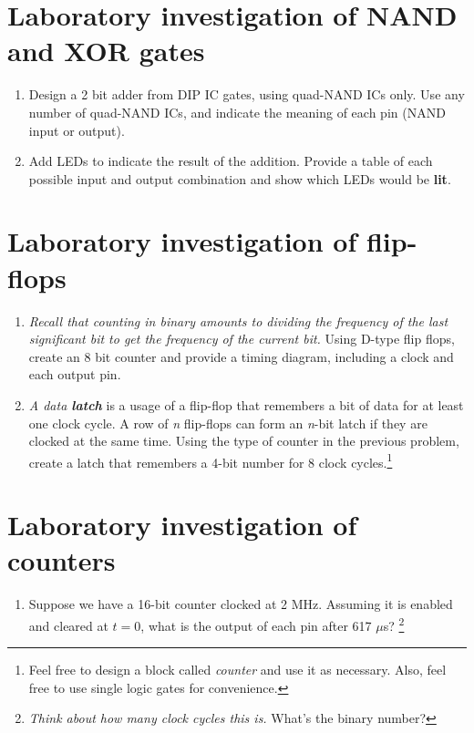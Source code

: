 \documentclass[10pt]{article}
\begin{document}
\section{Laboratory investigation of NAND and XOR gates}
\begin{enumerate}
\item Design a 2 bit adder from DIP IC gates, using quad-NAND ICs only.  Use any number of quad-NAND ICs, and indicate the meaning of each pin (NAND input or output). \\ \vspace{4cm}
\item Add LEDs to indicate the result of the addition.  Provide a table of each possible input and output combination and show which LEDs would be \textbf{lit}. \\ \vspace{4cm}
\end{enumerate}

\section{Laboratory investigation of flip-flops}
\begin{enumerate}
\item \textit{Recall that counting in binary amounts to dividing the frequency of the last significant bit to get the frequency of the current bit.}  Using D-type flip flops, create an 8 bit counter and provide a timing diagram, including a clock and each output pin. \\ \vspace{4cm}
\item \textit{A data \textbf{latch}} is a usage of a flip-flop that remembers a bit of data for at least one clock cycle.  A row of \textit{n} flip-flops can form an \textit{n}-bit latch if they are clocked at the same time.  Using the type of counter in the previous problem, create a latch that remembers a 4-bit number for 8 clock cycles.\footnote{Feel free to design a block called \textit{counter} and use it as necessary.  Also, feel free to use single logic gates for convenience.} \\ \vspace{4cm}
\end{enumerate}

\section{Laboratory investigation of counters}
\begin{enumerate}
\item Suppose we have a 16-bit counter clocked at 2 MHz.  Assuming it is enabled and cleared at $t=0$, what is the output of each pin after 617 $\mu$s?  \footnote{\textit{Think about how many clock cycles this is.}  What's the binary number?}
\end{enumerate}
\end{document}
